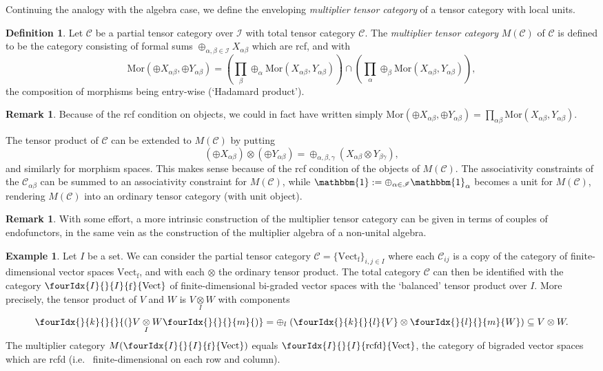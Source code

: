 \documentclass[11pt]{article}
\DeclareMathOperator{\fin}{\mathrm{f}}
\DeclareMathOperator{\rcf}{\mathrm{rcfd}}
\newcommand{\CatC}{\mathcal{C}}
\newcommand{\CatCC}{\mathscr{C}}
\newcommand{\Vectif}{\Gr{\mathrm{Vect}}{I}{I}{}{\fin}}
\newcommand{\Vectrcf}{\Gr{\mathrm{Vect}}{I}{I}{}{\rcf}}
\newcommand{\Mor}{\mathrm{Mor}}
\newcommand{\itimes}{\underset{I}{\otimes}}
\newcommand{\Vect}{\mathrm{Vect}}
\newcommand{\Unitb}{\mathbbm{1}}
\newcommand{\Gr}[5]{\fourIdx{#2}{#4}{#3}{#5}{#1}}%
\newcommand{\Gru}[3]{\Gr{#1}{}{}{#2}{#3}}
\theoremstyle{definition}
\newtheorem{Def}[Theorem]{Definition}
\newtheorem{Rem}[Theorem]{Remark}
\newtheorem{Exa}[Theorem]{Example}
\numberwithin{equation}{section}
\begin{document}
Continuing the analogy with the algebra case, we define the enveloping \emph{multiplier tensor category} of a tensor category with local units. 

\begin{Def} Let $\CatCC$ be a partial tensor category over $\mathscr{I}$ with total tensor category $\CatC$. The \emph{multiplier tensor category} $M(\CatC)$ of $\CatC$ is defined to be the category consisting of formal sums $\oplus_{\alpha,\beta\in \mathscr{I}} X_{\alpha\beta}$ which are rcf, and with \[\Mor(\oplus X_{\alpha\beta},\oplus Y_{\alpha\beta}) = \left(\prod_\beta\oplus_\alpha  \Mor(X_{\alpha\beta},Y_{\alpha\beta}) \right) \cap \left(\prod_\alpha\oplus_\beta \Mor(X_{\alpha\beta},Y_{\alpha\beta})\right),\] the composition of morphisms being entry-wise (`Hadamard product'). 
\end{Def}

\begin{Rem} Because of the rcf condition on objects, we could in fact have written simply $\Mor(\oplus X_{\alpha\beta},\oplus Y_{\alpha\beta}) = \prod_{\alpha\beta} \Mor(X_{\alpha\beta},Y_{\alpha\beta})$. 
\end{Rem} 

The tensor product of $\CatC$ can be extended to $M(\CatC)$ by putting \[\left(\oplus X_{\alpha\beta}\right)\otimes \left(\oplus Y_{\alpha\beta}\right) = \oplus_{\alpha,\beta,\gamma} \left(X_{\alpha\beta}\otimes Y_{\beta\gamma}\right),\] and similarly for morphism spaces. This makes sense because of the rcf condition of the objects of $M(\CatC)$. The associativity constraints of the $\CatC_{\alpha\beta}$ can be summed to an associativity constraint for $M(\CatC)$, while $\Unitb := \oplus_{\alpha\in \mathscr{I}} \Unitb_\alpha$ becomes a unit for $M(\CatC)$, rendering $M(\CatC)$ into an ordinary tensor category (with unit object).

\begin{Rem} With some effort, a more intrinsic construction of the multiplier tensor category can be given in terms of couples of endofunctors, in the same vein as the construction of the multiplier algebra of a non-unital algebra.
\end{Rem} 

\begin{Exa}\label{ExaVectBiGr} Let $I$ be a set. We can consider the partial tensor category $\CatCC = \{\Vect_{\fin}\}_{i,j\in I}$ where each $\CatC_{ij}$ is a copy of the category of finite-dimensional vector spaces $\Vect_{\fin}$, and with each $\otimes$ the ordinary tensor product. The total category $\CatC$ can then be identified with the category $\Vectif$ of finite-dimensional bi-graded vector spaces with the `balanced' tensor product over $I$. More precisely, the tensor product of $V$ and $W$ is $V\itimes W$ with components \[\Gru{(}{k}{}V\itimes W\Gru{)}{}{m} = \oplus_l \;(\Gru{V}{k}{l}\otimes \Gru{W}{l}{m})\subseteq V\otimes W.\] The multiplier category $M(\Vectif)$ equals $\Vectrcf$, the category of bigraded vector spaces which are rcfd (i.e.~ finite-dimensional on each row and column).
\end{Exa}
\end{document}
